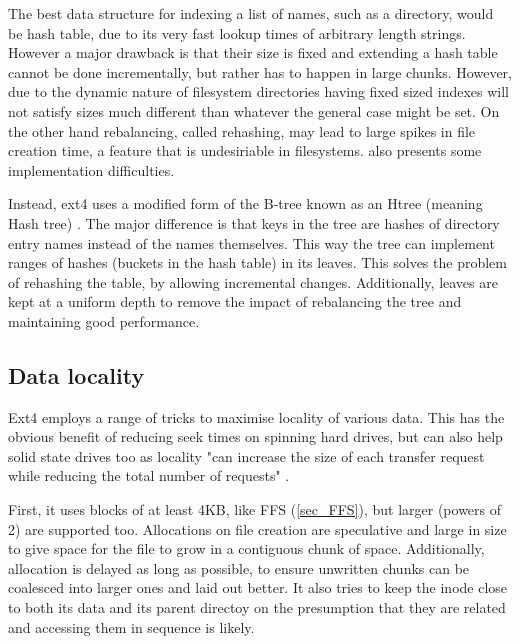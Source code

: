             The best data structure for indexing a list of names, such as a
            directory, would be hash table, due to its very fast lookup times
            of arbitrary length strings. However a major drawback is that their
            size is fixed and extending a hash table cannot be done
            incrementally, but rather has to happen in large chunks. However,
            due to the dynamic nature of filesystem directories having fixed
            sized indexes will not satisfy sizes much different than whatever
            the general case might be set. On the other hand rebalancing,
            called rehashing, may lead to large spikes in file creation time, a
            feature that is undesiriable in filesystems. \citeauthor{HTree}
            also presents some implementation difficulties.

            Instead, ext4 uses a modified form of the B-tree known as an Htree
            (meaning Hash tree) \cite{HTree}. The major difference is that keys
            in the tree are hashes of directory entry names instead of the
            names themselves. This way the tree can implement ranges of hashes
            (buckets in the hash table) in its leaves. This solves the problem
            of rehashing the table, by allowing incremental changes.
            Additionally, leaves are kept at a uniform depth to remove the
            impact of rebalancing the tree and maintaining good performance.

        \subsection{Data locality}
            \label{sec_locality}

            Ext4 employs a range of tricks to maximise locality of various
            data. This has the obvious benefit of reducing seek times on
            spinning hard drives, but can also help solid state drives too as
            locality "can increase the size of each transfer request while
            reducing the total number of requests" \cite{ext4_docs}.

            First, it uses blocks of at least 4KB, like FFS (\ref{sec_FFS}),
            but larger (powers of 2) are supported too. Allocations on file
            creation are speculative and large in size to give space for the
            file to grow in a contiguous chunk of space. Additionally,
            allocation is delayed as long as possible, to ensure unwritten
            chunks can be coalesced into larger ones and laid out better. It
            also tries to keep the inode close to both its data and its parent
            directoy on the presumption that they are related and accessing
            them in sequence is likely.

